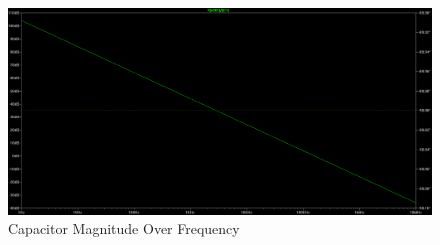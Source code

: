 \begin{figure}
\includegraphics[keepaspectratio=true,width=6in]{./figures/parameters/capMag.png}
\centering
\caption{Capacitor Magnitude Over Frequency}
\label{capMag}
\end{figure}
